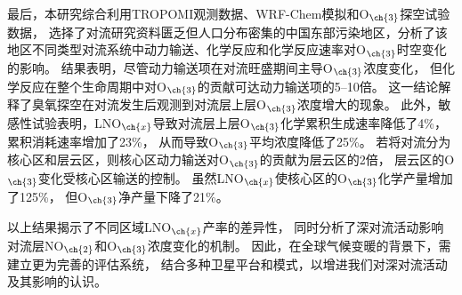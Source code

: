 {最后，本研究综合利用TROPOMI观测数据、WRF-Chem模拟和O$_{\ch{3}}$探空试验数据，
选择了对流研究资料匮乏但人口分布密集的中国东部污染地区，分析了该地区不同类型对流系统中动力输送、化学反应和化学反应速率对O$_{\ch{3}}$时空变化的影响。
结果表明，尽管动力输送项在对流旺盛期间主导O$_{\ch{3}}$浓度变化，
但化学反应在整个生命周期中对O$_{\ch{3}}$的贡献可达动力输送项的5--10倍。
这一结论解释了臭氧探空在对流发生后观测到对流层上层O$_{\ch{3}}$浓度增大的现象。
此外，敏感性试验表明，LNO$_{\ch{x}}$导致对流层上层O$_{\ch{3}}$化学累积生成速率降低了4\%，累积消耗速率增加了23\%，
从而导致O$_{\ch{3}}$平均浓度降低了25\%。
若将对流分为核心区和层云区，则核心区动力输送对O$_{\ch{3}}$的贡献为层云区的2倍，
层云区的O$_{\ch{3}}$变化受核心区输送的控制。
虽然LNO$_{\ch{x}}$使核心区的O$_{\ch{3}}$化学产量增加了125\%，
但O$_{\ch{3}}$净产量下降了21\%。

以上结果揭示了不同区域LNO$_{\ch{x}}$产率的差异性，
同时分析了深对流活动影响对流层NO$_{\ch{2}}$和O$_{\ch{3}}$浓度变化的机制。
因此，在全球气候变暖的背景下，需建立更为完善的评估系统，
结合多种卫星平台和模式，以增进我们对深对流活动及其影响的认识。
}
